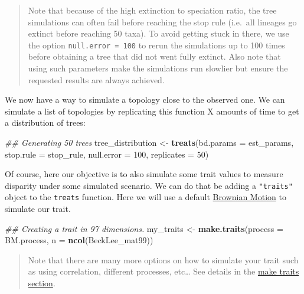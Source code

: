 \documentclass[
]{book}
\newenvironment{Shaded}{\begin{snugshade}}{\end{snugshade}}
\newcommand{\CommentTok}[1]{\textcolor[rgb]{0.56,0.35,0.01}{\textit{#1}}}
\newcommand{\DataTypeTok}[1]{\textcolor[rgb]{0.13,0.29,0.53}{#1}}
\newcommand{\DecValTok}[1]{\textcolor[rgb]{0.00,0.00,0.81}{#1}}
\newcommand{\KeywordTok}[1]{\textcolor[rgb]{0.13,0.29,0.53}{\textbf{#1}}}
\newcommand{\NormalTok}[1]{#1}
\newcommand{\StringTok}[1]{\textcolor[rgb]{0.31,0.60,0.02}{#1}}
\begin{document}
\begin{quote}
Note that because of the high extinction to speciation ratio, the tree simulations can often fail before reaching the stop rule (i.e.~all lineages go extinct before reaching 50 taxa). To avoid getting stuck in there, we use the option \texttt{null.error\ =\ 100} to rerun the simulations up to 100 times before obtaining a tree that did not went fully extinct. Also note that using such parameters make the simulations run slowlier but ensure the requested results are always achieved.
\end{quote}

We now have a way to simulate a topology close to the observed one. We can simulate a list of topologies by replicating this function X amounts of time to get a distribution of trees:

\begin{Shaded}
\begin{Highlighting}[]
\CommentTok{\#\# Generating 50 trees}
\NormalTok{tree\_distribution \textless{}{-}}\StringTok{ }\KeywordTok{treats}\NormalTok{(}\DataTypeTok{bd.params  =}\NormalTok{ est\_params,}
                            \DataTypeTok{stop.rule  =}\NormalTok{ stop\_rule,}
                            \DataTypeTok{null.error =} \DecValTok{100}\NormalTok{,}
                            \DataTypeTok{replicates =} \DecValTok{50}\NormalTok{)}
\end{Highlighting}
\end{Shaded}

Of course, here our objective is to also simulate some trait values to measure disparity under some simulated scenario.
We can do that be adding a \texttt{"traits"} object to the \texttt{treats} function.
Here we will use a default \href{https://en.wikipedia.org/wiki/Brownian_motion}{Brownian Motion} to simulate our trait.

\begin{Shaded}
\begin{Highlighting}[]
\CommentTok{\#\# Creating a trait in 97 dimensions.}
\NormalTok{my\_traits \textless{}{-}}\StringTok{ }\KeywordTok{make.traits}\NormalTok{(}\DataTypeTok{process =}\NormalTok{ BM.process, }\DataTypeTok{n =} \KeywordTok{ncol}\NormalTok{(BeckLee\_mat99))}
\end{Highlighting}
\end{Shaded}

\begin{quote}
Note that there are many more options on how to simulate your trait such as using correlation, different processes, etc\ldots{} See details in the \protect\hyperlink{maketraits}{make traits section}.
\end{quote}
\end{document}
